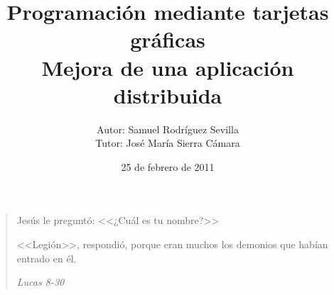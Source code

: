 \documentclass[12pt]{book}
\begin{document}
	\title{Programación mediante tarjetas gráficas\\Mejora de una aplicación distribuida}
	\author{Autor: Samuel Rodríguez Sevilla\\Tutor: José María Sierra Cámara}

	\date{25 de febrero de 2011}
	\maketitle

	\section*{}
	\pagebreak\newpage

	\vspace*{\fill}
	\begin{quote}
		Jesús le preguntó: <<¿Cuál es tu nombre?>>

		<<Legión>>, respondió, porque eran muchos los demonios que habían entrado en él.

		\emph{Lucas 8-30}
	\end{quote}
	\vspace*{\fill}

	\pagebreak\newpage
	\section*{}
	\pagebreak\newpage
	


	\tableofcontents
	\listoffigures
	\listoftables

	
	
	
	
	
	
	

	\appendix

	
	
	
	
	
	
	
	

	
\end{document}
